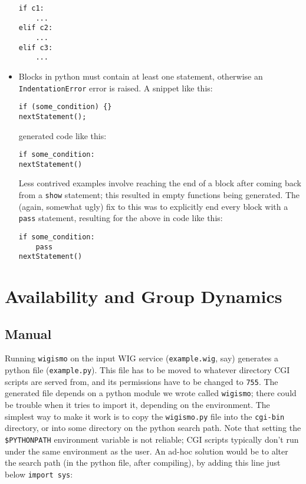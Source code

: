 \documentclass{WigReport}
\begin{document}
\begin{itemize}
\begin{verbatim}
if c1:
    ...
elif c2:
    ...
elif c3:
    ...
\end{verbatim}
\item Blocks in python must contain at least one statement, otherwise an
{\tt IndentationError} error is raised. A snippet like this:

\begin{verbatim}
if (some_condition) {}
nextStatement();
\end{verbatim}

generated code like this:

\begin{verbatim}
if some_condition:
nextStatement()
\end{verbatim}

Less contrived examples involve reaching the end of a block after coming
back from a {\tt show} statement; this resulted in empty functions being
generated. The (again, somewhat ugly) fix to this was to explicitly end 
every block with a {\tt pass} statement, resulting for the above in code
like this:

\begin{verbatim}
if some_condition:
    pass
nextStatement()
\end{verbatim}
\end{itemize}

\clearpage

\section{Availability and Group Dynamics}
\subsection{Manual}
Running {\tt wigismo} on the input WIG service ({\tt example.wig}, say)
generates a python file ({\tt example.py}). This file has to be moved to
whatever directory CGI scripts are served from, and its permissions have
to be changed to {\tt 755}. The generated file depends on a python module 
we wrote called {\tt wigismo}; there could be trouble when it tries to
import it, depending on the environment. The simplest way to make it work
is to copy the {\tt wigismo.py} file into the {\tt cgi-bin} directory, or
into some directory on the python search path. Note that setting the
{\tt \$PYTHONPATH} environment variable is not reliable; CGI scripts
typically don't run under the same environment as the user. An ad-hoc
solution would be to alter the search path (in the python file, after
compiling), by adding this line just below {\tt import sys}:
\end{document}
